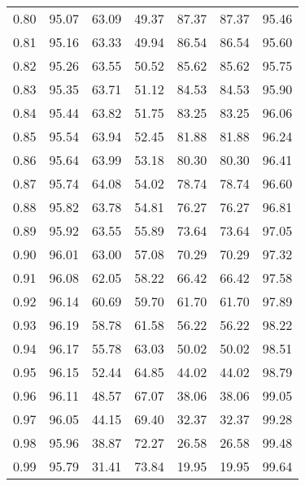 \begin{tabular}{|c|c|c|c|c|c|c|}
      0.80 &     95.07 &     63.09 &      49.37 &   87.37 &      87.37 &         95.46 \\
      0.81 &     95.16 &     63.33 &      49.94 &   86.54 &      86.54 &         95.60 \\
      0.82 &     95.26 &     63.55 &      50.52 &   85.62 &      85.62 &         95.75 \\
      0.83 &     95.35 &     63.71 &      51.12 &   84.53 &      84.53 &         95.90 \\
      0.84 &     95.44 &     63.82 &      51.75 &   83.25 &      83.25 &         96.06 \\
      0.85 &     95.54 &     63.94 &      52.45 &   81.88 &      81.88 &         96.24 \\
      0.86 &     95.64 &     63.99 &      53.18 &   80.30 &      80.30 &         96.41 \\
      0.87 &     95.74 &     64.08 &      54.02 &   78.74 &      78.74 &         96.60 \\
      0.88 &     95.82 &     63.78 &      54.81 &   76.27 &      76.27 &         96.81 \\
      0.89 &     95.92 &     63.55 &      55.89 &   73.64 &      73.64 &         97.05 \\
      0.90 &     96.01 &     63.00 &      57.08 &   70.29 &      70.29 &         97.32 \\
      0.91 &     96.08 &     62.05 &      58.22 &   66.42 &      66.42 &         97.58 \\
      0.92 &     96.14 &     60.69 &      59.70 &   61.70 &      61.70 &         97.89 \\
      0.93 &     96.19 &     58.78 &      61.58 &   56.22 &      56.22 &         98.22 \\
      0.94 &     96.17 &     55.78 &      63.03 &   50.02 &      50.02 &         98.51 \\
      0.95 &     96.15 &     52.44 &      64.85 &   44.02 &      44.02 &         98.79 \\
      0.96 &     96.11 &     48.57 &      67.07 &   38.06 &      38.06 &         99.05 \\
      0.97 &     96.05 &     44.15 &      69.40 &   32.37 &      32.37 &         99.28 \\
      0.98 &     95.96 &     38.87 &      72.27 &   26.58 &      26.58 &         99.48 \\
      0.99 &     95.79 &     31.41 &      73.84 &   19.95 &      19.95 &         99.64 \\
\bottomrule
\end{tabular}
